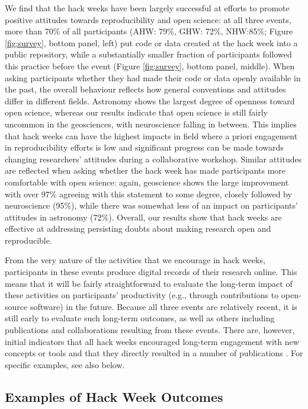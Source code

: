 We find that the hack weeks have been largely successful at efforts to promote positive attitudes towards reproducibility and open science: at all three events, more than 70\% of all participants (AHW: 79\%, GHW: 72\%, NHW:85\%; Figure \ref{fig:survey}, bottom panel, left) put code or data created at the hack week into a public repository, while a substantially smaller fraction of participants followed this practice before the event (Figure \ref{fig:survey}, bottom panel, middle).
When asking participants whether they had made their code or data openly available in the past, the overall behaviour reflects how general conventions and attitudes differ in different fields.
Astronomy shows the largest degree of openness toward open science, whereas our results indicate that open science is still fairly uncommon in the geosciences, with neuroscience falling in between.
This implies that hack weeks can have the highest impacts in field where a priori engagement in reproducibility efforts is low and significant progress can be made towards changing researchers' attitudes during a collaborative workshop.
Similar attitudes are reflected when asking whether the hack week has made participants more comfortable with open science: again, geoscience shows the large improvement with over 97\% agreeing with this statement to some degree, closely followed by neuroscience (95\%), while there was somewhat less of an impact on participants' attitudes in astronomy (72\%).
Overall, our results show that hack weeks are effective at addressing persisting doubts about making research open and reproducible.

From the very nature of the activities that we encourage in hack weeks, participants in these events produce digital records of their research online. This means that it will be fairly straightforward to evaluate the long-term impact of these activities on participants' productivity (e.g., through contributions to open-source software) in the future. Because all three events are relatively recent, it is still early to evaluate such long-term outcomes, as well as others including publications and collaborations resulting from these events.
There are, however, initial indicators that all hack weeks encouraged long-term engagement with new concepts or tools and that they directly resulted in a number of publications \cite{gullysantiago2015,faria2016,keshavan2017,leonard2017,jordan2017,peterson2017,hahn2017,pricewhelan2017}. For specific examples, see also below.

\subsection{Examples of Hack Week Outcomes}
\label{sec:outcomes}

